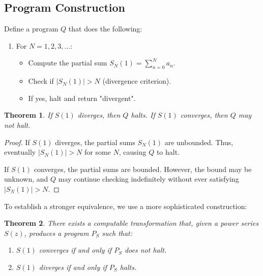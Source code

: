 \documentclass[12pt, a4paper]{article}
\newtheorem{theorem}{Theorem}
\begin{document}
\subsection{Program Construction}
Define a program $Q$ that does the following:
\begin{enumerate}
\item For $N = 1, 2, 3, \ldots$:
\begin{itemize}
\item Compute the partial sum $S_N(1) = \sum_{n=0}^{N} a_n$.
\item Check if $|S_N(1)| > N$ (divergence criterion).
\item If yes, halt and return "divergent".
\end{itemize}
\end{enumerate}

\begin{theorem}
If $S(1)$ diverges, then $Q$ halts. If $S(1)$ converges, then $Q$ may not halt.
\end{theorem}

\begin{proof}
If $S(1)$ diverges, the partial sums $S_N(1)$ are unbounded. Thus, eventually $|S_N(1)| > N$ for some $N$, causing $Q$ to halt.

If $S(1)$ converges, the partial sums are bounded. However, the bound may be unknown, and $Q$ may continue checking indefinitely without ever satisfying $|S_N(1)| > N$.
\end{proof}

To establish a stronger equivalence, we use a more sophisticated construction:

\begin{theorem}
There exists a computable transformation that, given a power series $S(z)$, produces a program $P_S$ such that:
\begin{enumerate}
\item $S(1)$ converges if and only if $P_S$ does not halt.
\item $S(1)$ diverges if and only if $P_S$ halts.
\end{enumerate}
\end{theorem}
\end{document}
